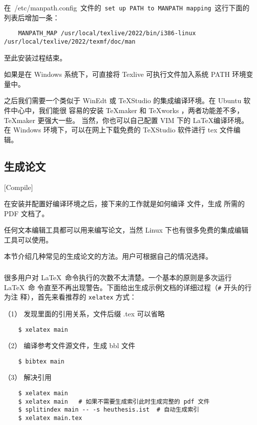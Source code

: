 在~{/etc/manpath.config}~文件的~\texttt{set up PATH to  MANPATH mapping}~这行下面的列表后增加一条：

\begin{lstlisting}
    MANPATH_MAP /usr/local/texlive/2022/bin/i386-linux /usr/local/texlive/2022/texmf/doc/man
\end{lstlisting}

至此安装过程结束。

如果是在 Windows 系统下，可直接将 Texlive 可执行文件加入系统 PATH 环境变量中。

之后我们需要一个类似于 WinEdt 或 TeXStudio 的集成编译环境。在 Ubuntu 软件中心中，我们能很
容易的安装 \TeX{}maker 和 \TeX{}works ，两者功能差不多， \TeX{}maker 更强大一些。
当然，你也可以自己配置 VIM 下的 \LaTeX{}编译环境。在 Windows 环境下，可以在网上下载免费的
TeXStudio 软件进行 tex 文件编辑。

\subsection{生成论文}[Compile]
\label{sec:generate-thesis}

在安装并配置好编译环境之后，接下来的工作就是如何编译 \XeLaTeX{} 文件，生成
所需的 PDF 文档了。

任何文本编辑工具都可以用来编写论文，当然 Linux 下也有很多免费的集成编辑工具可以使用。

本节介绍几种常见的生成论文的方法。用户可根据自己的情况选择。

\subsubsection{\XeLaTeX}
\label{sec:xelatex}

很多用户对 \LaTeX\ 命令执行的次数不太清楚。一个基本的原则是多次运行 \LaTeX\ 命
令直至不再出现警告。下面给出生成示例文档的详细过程（\texttt{\#} 开头的行为注
释），首先来看推荐的 \texttt{xelatex} 方式：

（1） 发现里面的引用关系，文件后缀 .tex 可以省略

\begin{lstlisting}
    $ xelatex main
\end{lstlisting}

（2） 编译参考文件源文件，生成 bbl 文件

\begin{lstlisting}
    $ bibtex main
\end{lstlisting}

（3） 解决引用

\begin{lstlisting}
    $ xelatex main
    $ xelatex main   # 如果不需要生成索引此时生成完整的 pdf 文件
    $ splitindex main -- -s heuthesis.ist  # 自动生成索引
    $ xelatex main.tex
\end{lstlisting}

